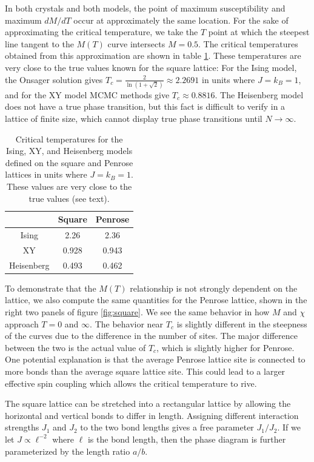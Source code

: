 \documentclass[
  amsmath,
  amssymb,
  aps,
  twocolumn,
  nofootinbib,
  floatfix,
]{revtex4-2}
\begin{document}
In both crystals and both models, the point of maximum susceptibility and maximum $dM/dT$ occur at approximately the same location. For the sake of approximating the critical temperature, we take the $T$ point at which the steepest line tangent to the $M(T)$ curve intersects $M=0.5$. The critical temperatures obtained from this approximation are shown in table \ref{tab:tc}. These temperatures are very close to the true values known for the square lattice: For the Ising model, the Onsager solution gives $T_c = \frac{2}{\ln(1 + \sqrt{2})} \approx 2.2691$ in units where $J=k_B=1$, and for the XY model MCMC methods give $T_c \approx 0.8816$. The Heisenberg model does not have a true phase transition, but this fact is difficult to verify in a lattice of finite size, which cannot display true phase transitions until $N\rightarrow \infty$. 
\begin{table}
  \centering
  \begin{tabular}{c|cc}
    \hline \hline
    & Square & Penrose \\ \hline
    Ising & 2.26 & 2.36\\
    XY & 0.928 & 0.943\\
    Heisenberg & 0.493 & 0.462\\ \hline \hline
  \end{tabular}
  \caption{Critical temperatures for the Ising, XY, and Heisenberg models defined on the square and Penrose lattices in units where $J = k_B = 1$. These values are very close to the true values (see text).}
  \label{tab:tc}
\end{table}

To demonstrate that the $M(T)$ relationship is not strongly dependent on the lattice, we also compute the same quantities for the Penrose lattice, shown in the right two panels of figure \ref{fig:square}. We see the same behavior in how $M$ and $\chi$ approach $T=0$ and $\infty$. The behavior near $T_c$ is slightly different in the steepness of the curves due to the difference in the number of sites. The major difference between the two is the actual value of $T_c$, which is slightly higher for Penrose. One potential explanation is that the average Penrose lattice site is connected to more bonds than the average square lattice site. This could lead to a larger effective spin coupling which allows the critical temperature to rive.

The square lattice can be stretched into a rectangular lattice by allowing the horizontal and vertical bonds to differ in length. Assigning different interaction strengths $J_1$ and $J_2$ to the two bond lengths gives a free parameter $J_1/J_2$. If we let $J \propto \ell^{-2}$ where $\ell$ is the bond length, then the phase diagram is further parameterized by the length ratio $a/b$.
\end{document}
